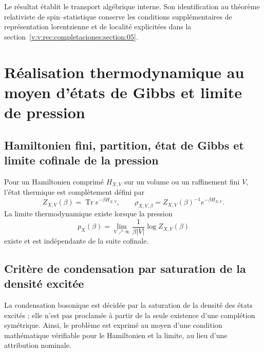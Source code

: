 Le résultat établit le transport algébrique interne. Son identification
au théorème relativiste de spin--statistique conserve les conditions
supplémentaires de représentation lorentzienne et de localité explicitées dans la
section~\ref{v:v:rec:completaciones:section:05}.

\clearpage
\section{Réalisation thermodynamique au moyen d’états de Gibbs et limite de pression}
\label{v:v:rec:fock_gibbs:section:04}

\subsection{Hamiltonien fini, partition, état de Gibbs et limite cofinale de la pression}
\label{v:v:rec:fock_gibbs:section:05}

Pour un Hamiltonien comprimé \(H_{X,V}\) sur un volume ou un raffinement
fini \(V\), l’état thermique est complètement défini par
\[
 Z_{X,V}(\beta)=\operatorname{Tr}e^{-\beta H_{X,V}},
 \qquad
 \rho_{X,V,\beta}=Z_{X,V}(\beta)^{-1}e^{-\beta H_{X,V}}.
\]
La limite thermodynamique existe lorsque la pression
\[
 p_X(\beta)=\lim_{V\nearrow\infty}
 \frac1{\beta |V|}\log Z_{X,V}(\beta)
\]
existe et est indépendante de la suite cofinale.

\subsection{Critère de condensation par saturation de la densité excitée}
\label{v:v:rec:fock_gibbs:section:06}

La condensation bosonique est
décidée par la saturation de la densité des états excités ; elle n’est pas proclamée à
partir de la seule existence d’une complétion symétrique. Ainsi, le problème
est exprimé au moyen d’une condition mathématique vérifiable pour le
Hamiltonien et la limite, au lieu d’une attribution nominale.
